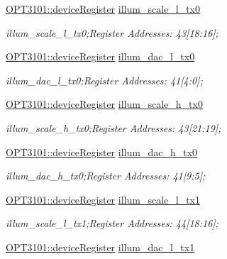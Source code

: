 \begin{DoxyCompactItemize}
\mbox{\hyperlink{class_o_p_t3101_1_1device_register}{O\+P\+T3101\+::device\+Register}} \mbox{\hyperlink{class_o_p_t3101_1_1registers_a16c4b06813716b1a536015e7089c2d22}{illum\+\_\+scale\+\_\+l\+\_\+tx0}}
\begin{DoxyCompactList}\small\item\em illum\+\_\+scale\+\_\+l\+\_\+tx0;Register Addresses\+: 43\mbox{[}18\+:16\mbox{]}; \end{DoxyCompactList}\item 
\mbox{\hyperlink{class_o_p_t3101_1_1device_register}{O\+P\+T3101\+::device\+Register}} \mbox{\hyperlink{class_o_p_t3101_1_1registers_a2bd8d2bb0c66cd151128107e2e7bdd02}{illum\+\_\+dac\+\_\+l\+\_\+tx0}}
\begin{DoxyCompactList}\small\item\em illum\+\_\+dac\+\_\+l\+\_\+tx0;Register Addresses\+: 41\mbox{[}4\+:0\mbox{]}; \end{DoxyCompactList}\item 
\mbox{\hyperlink{class_o_p_t3101_1_1device_register}{O\+P\+T3101\+::device\+Register}} \mbox{\hyperlink{class_o_p_t3101_1_1registers_a779e2ac88dbf024631877a8fe1446e25}{illum\+\_\+scale\+\_\+h\+\_\+tx0}}
\begin{DoxyCompactList}\small\item\em illum\+\_\+scale\+\_\+h\+\_\+tx0;Register Addresses\+: 43\mbox{[}21\+:19\mbox{]}; \end{DoxyCompactList}\item 
\mbox{\hyperlink{class_o_p_t3101_1_1device_register}{O\+P\+T3101\+::device\+Register}} \mbox{\hyperlink{class_o_p_t3101_1_1registers_a527fc5156f3e32d11843aaa7ef921612}{illum\+\_\+dac\+\_\+h\+\_\+tx0}}
\begin{DoxyCompactList}\small\item\em illum\+\_\+dac\+\_\+h\+\_\+tx0;Register Addresses\+: 41\mbox{[}9\+:5\mbox{]}; \end{DoxyCompactList}\item 
\mbox{\hyperlink{class_o_p_t3101_1_1device_register}{O\+P\+T3101\+::device\+Register}} \mbox{\hyperlink{class_o_p_t3101_1_1registers_aebec846336763223336cfe9673dbcda2}{illum\+\_\+scale\+\_\+l\+\_\+tx1}}
\begin{DoxyCompactList}\small\item\em illum\+\_\+scale\+\_\+l\+\_\+tx1;Register Addresses\+: 44\mbox{[}18\+:16\mbox{]}; \end{DoxyCompactList}\item 
\mbox{\hyperlink{class_o_p_t3101_1_1device_register}{O\+P\+T3101\+::device\+Register}} \mbox{\hyperlink{class_o_p_t3101_1_1registers_a4af53c407da5606b0bf597fb0170903b}{illum\+\_\+dac\+\_\+l\+\_\+tx1}}

\end{DoxyCompactItemize}
